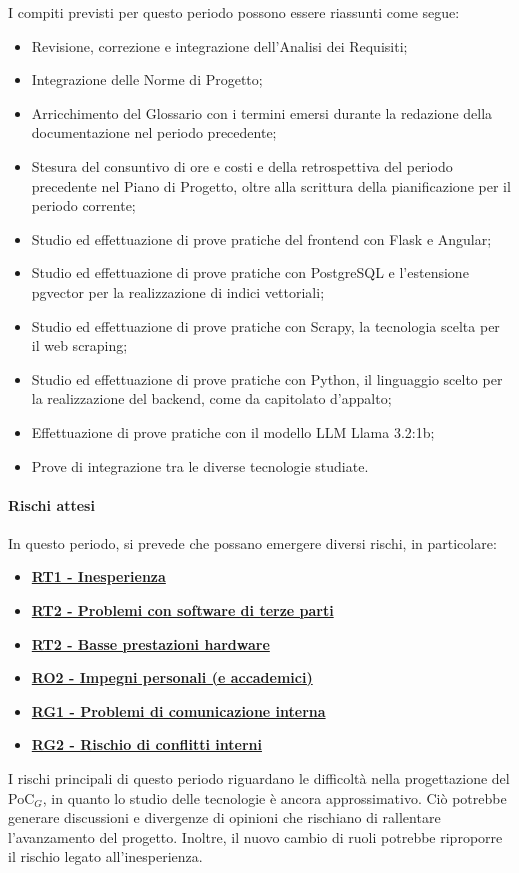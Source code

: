 I compiti previsti per questo periodo possono essere riassunti come segue:  
\begin{itemize}
    \item Revisione, correzione e integrazione dell'Analisi dei Requisiti;
    \item Integrazione delle Norme di Progetto;
    \item Arricchimento del Glossario con i termini emersi durante la redazione della documentazione nel periodo precedente;
    \item Stesura del consuntivo di ore e costi e della retrospettiva del periodo precedente nel Piano di Progetto, oltre alla scrittura della pianificazione per il periodo corrente;
    \item Studio ed effettuazione di prove pratiche del frontend con Flask e Angular;
    \item Studio ed effettuazione di prove pratiche con PostgreSQL e l'estensione pgvector per la realizzazione di indici vettoriali;
    \item Studio ed effettuazione di prove pratiche con Scrapy, la tecnologia scelta per il web scraping;
    \item Studio ed effettuazione di prove pratiche con Python, il linguaggio scelto per la realizzazione del backend, come da capitolato d'appalto;
    \item Effettuazione di prove pratiche con il modello LLM Llama 3.2:1b;
    \item Prove di integrazione tra le diverse tecnologie studiate.
\end{itemize}

\paragraph{Rischi attesi}  
In questo periodo, si prevede che possano emergere diversi rischi, in particolare:

\begin{itemize}
    \item \textbf{\hyperlink{RT1}{RT1 - Inesperienza}}
    \item \textbf{\hyperlink{RT2}{RT2 - Problemi con software di terze parti}}
    \item \textbf{\hyperlink{RT2}{RT2 - Basse prestazioni hardware}}
    \item \textbf{\hyperlink{RO2}{RO2 - Impegni personali (e accademici)}}
    \item \textbf{\hyperlink{RG1}{RG1 - Problemi di comunicazione interna}}
    \item \textbf{\hyperlink{RG2}{RG2 - Rischio di conflitti interni}}
\end{itemize}
I rischi principali di questo periodo riguardano le difficoltà nella progettazione del PoC$_G$, in quanto lo studio delle tecnologie è ancora approssimativo. Ciò potrebbe generare discussioni e divergenze di opinioni che rischiano di rallentare l'avanzamento del progetto.
Inoltre, il nuovo cambio di ruoli potrebbe riproporre il rischio legato all'inesperienza.

